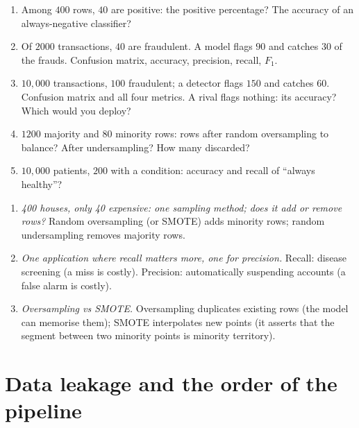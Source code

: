 \documentclass[11pt]{article}
\begin{document}
\begin{tryit}
\begin{enumerate}[label=\textbf{E15.\arabic*}]
  \item Among $400$ rows, $40$ are positive: the positive percentage? The
    accuracy of an always-negative classifier?
  \item Of $2000$ transactions, $40$ are fraudulent. A model flags $90$ and
    catches $30$ of the frauds. Confusion matrix, accuracy, precision, recall,
    $F_1$.
  \item $10{,}000$ transactions, $100$ fraudulent; a detector flags $150$ and
    catches $60$. Confusion matrix and all four metrics. A rival flags
    nothing: its accuracy? Which would you deploy?
  \item $1200$ majority and $80$ minority rows: rows after random oversampling
    to balance? After undersampling? How many discarded?
  \item $10{,}000$ patients, $200$ with a condition: accuracy and recall of
    ``always healthy''?
\end{enumerate}
\end{tryit}

\begin{concept}
\begin{enumerate}[label=\textbf{C15.\arabic*}]
  \item \emph{400 houses, only 40 expensive: one sampling method; does it add
    or remove rows?} Random oversampling (or SMOTE) adds minority rows; random
    undersampling removes majority rows.
  \item \emph{One application where recall matters more, one for precision.}
    Recall: disease screening (a miss is costly). Precision: automatically
    suspending accounts (a false alarm is costly).
  \item \emph{Oversampling vs SMOTE.} Oversampling duplicates existing rows
    (the model can memorise them); SMOTE interpolates new points (it asserts
    that the segment between two minority points is minority territory).
\end{enumerate}
\end{concept}

\section{Data leakage and the order of the pipeline}
\label{sec:leakage}
\end{document}
